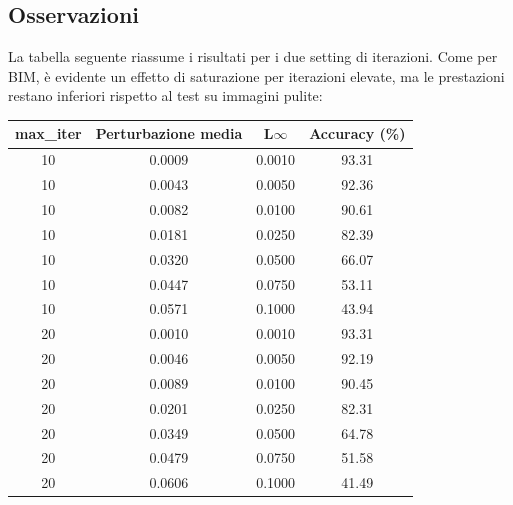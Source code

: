         \subsection{Osservazioni}
            La tabella seguente riassume i risultati per i due setting di iterazioni. Come per BIM, è evidente un effetto di saturazione per iterazioni elevate, ma le prestazioni restano inferiori rispetto al test su immagini pulite:
                \begin{center}
                    \begin{tabular}{cccc}
                        \toprule
                        \textbf{max\_iter} & \textbf{Perturbazione media} & \textbf{L$\infty$} & \textbf{Accuracy (\%)} \\
                        \midrule
                        10 & 0.0009 & 0.0010 & 93.31 \\
                        10 & 0.0043 & 0.0050 & 92.36 \\
                        10 & 0.0082 & 0.0100 & 90.61 \\
                        10 & 0.0181 & 0.0250 & 82.39 \\
                        10 & 0.0320 & 0.0500 & 66.07 \\
                        10 & 0.0447 & 0.0750 & 53.11 \\
                        10 & 0.0571 & 0.1000 & 43.94 \\
                        \midrule
                        20 & 0.0010 & 0.0010 & 93.31 \\
                        20 & 0.0046 & 0.0050 & 92.19 \\
                        20 & 0.0089 & 0.0100 & 90.45 \\
                        20 & 0.0201 & 0.0250 & 82.31 \\
                        20 & 0.0349 & 0.0500 & 64.78 \\
                        20 & 0.0479 & 0.0750 & 51.58 \\
                        20 & 0.0606 & 0.1000 & 41.49 \\
                        \bottomrule
                    \end{tabular}
                \end{center}


